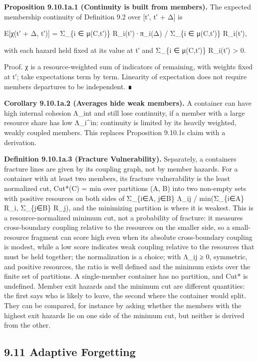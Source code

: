 \documentclass[
]{article}
\begin{document}
\textbf{Proposition 9.10.1a.1 (Continuity is built from members).} The
expected membership continuity of Definition 9.2 over {[}t′, t′ + Δ{]}
is

E{[}χ(t′ + Δ, t′){]} = Σ\_\{i ∈ μ(C,t′)\} R\_i(t′)·π\_i(Δ) / Σ\_\{i ∈
μ(C,t′)\} R\_i(t′),

with each hazard held fixed at its value at t′ and Σ\_\{i ∈ μ(C,t′)\}
R\_i(t′) \textgreater{} 0.

Proof. χ is a resource-weighted sum of indicators of remaining, with
weights fixed at t′; take expectations term by term. Linearity of
expectation does not require members\textquotesingle{} departures to be
independent. ∎

\textbf{Corollary 9.10.1a.2 (Averages hide weak members).} A container
can have high internal cohesion Λ\_int and still lose continuity, if a
member with a large resource share has low Λ\_i\^{}in: continuity is
limited by its heavily weighted, weakly coupled members. This replaces
Proposition 9.10.1\textquotesingle s claim with a derivation.

\textbf{Definition 9.10.1a.3 (Fracture Vulnerability).} Separately, a
container\textquotesingle s fracture lines are given by its coupling
graph, not by member hazards. For a container with at least two members,
its fracture vulnerability is the least normalized cut, Cut*(C) = min
over partitions (A, B) into two non-empty sets with positive resources
on both sides of Σ\_\{i∈A, j∈B\} Λ\_ij / min(Σ\_\{i∈A\} R\_i, Σ\_\{j∈B\}
R\_j), and the minimizing partition is where it is weakest. This is a
resource-normalized minimum cut, not a probability of fracture: it
measures cross-boundary coupling relative to the resources on the
smaller side, so a small-resource fragment can score high even when its
absolute cross-boundary coupling is modest, while a low score indicates
weak coupling relative to the resources that must be held together; the
normalization is a choice; with Λ\_ij ≥ 0, symmetric, and positive
resources, the ratio is well defined and the minimum exists over the
finite set of partitions. A single-member container has no partition,
and Cut* is undefined. Member exit hazards and the minimum cut are
different quantities: the first says who is likely to leave, the second
where the container would split. They can be compared, for instance by
asking whether the members with the highest exit hazards lie on one side
of the minimum cut, but neither is derived from the other.

\hypertarget{adaptive-forgetting}{%
\subsection{9.11 Adaptive Forgetting}\label{adaptive-forgetting}}
\end{document}
